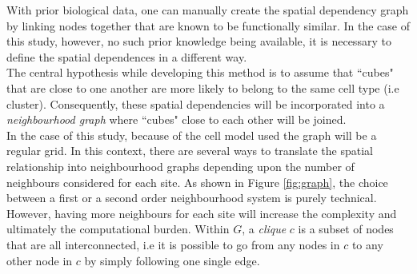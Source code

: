 With prior biological data, one can manually create the spatial dependency graph by linking nodes together that are known to be functionally similar. In the case of this study, however, no such prior knowledge being available, it is necessary to define the spatial dependences in a different way.\\

The central hypothesis while developing this method is to assume that ``cubes" that are close to one another are more likely to belong to the same cell type (i.e cluster). Consequently, these spatial dependencies will be incorporated into a \emph{neighbourhood graph} where  ``cubes" close to each other will be joined.\\

In the case of this study, because of the cell model used the graph will be a regular grid. In this context, there are several ways to translate the spatial relationship into neighbourhood graphs depending upon the number of neighbours considered for each site. As shown in Figure \ref{fig:graph}, the choice between a first or a second order neighbourhood system is purely technical. However, having more neighbours for each site will increase the complexity and ultimately the computational burden. Within $G$, a \emph{clique} $c$ is a subset of nodes that are all interconnected, i.e it is possible to go from any nodes in $c$ to any other node in $c$ by simply following one single edge.\\

